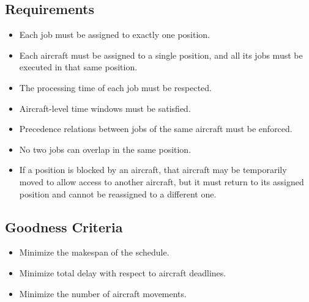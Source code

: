 \subsection*{Requirements}

\begin{itemize}
    \item[RQ01:] Each job must be assigned to exactly one position.

    \item[RQ02:] Each aircraft must be assigned to a single position, and all its jobs must be executed in that same position.
    
    \item[RQ03:] The processing time of each job must be respected.
    
    \item[RQ04:] Aircraft-level time windows must be satisfied.
    
    \item[RQ05:] Precedence relations between jobs of the same aircraft must be enforced.
    
    \item[RQ06:] No two jobs can overlap in the same position.
    
    \item[RQ07:] If a position is blocked by an aircraft, that aircraft may be temporarily moved to allow access to another aircraft, but it must return to its assigned position and cannot be reassigned to a different one.
    

\end{itemize}

\subsection*{Goodness Criteria}

\begin{itemize}
    \item[OF01:] Minimize the makespan of the schedule.
    
    \item[OF02:] Minimize total delay with respect to aircraft deadlines.
    
    \item[OF03:] Minimize the number of aircraft movements.
    
    
    
\end{itemize}